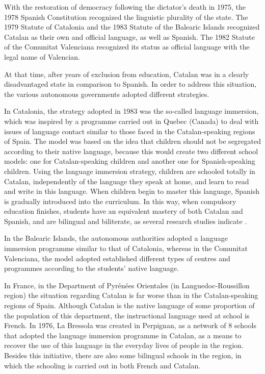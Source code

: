\begin{multicols}{2}
With the restoration of democracy following the dictator's death in 1975, the 1978 Spanish Constitution recognized the linguistic plurality of the state. The 1979 Statute of Catalonia and the 1983 Statute of the Balearic Islands recognized Catalan as their own and official language, as well as Spanish. The 1982 Statute of the Comunitat Valenciana recognized its status as official language with the legal name of Valencian.

At that time, after years of exclusion from education, Catalan was in a clearly disadvantaged state in comparison to Spanish. In order to address this situation, the various autonomous governments adopted different strategies.

In Catalonia, the strategy adopted in 1983 was the so-called language immersion, which was inspired by a programme carried out in Quebec (Canada) to deal with issues of language contact similar to those faced in the Catalan-speaking regions of Spain. The model was based on the idea that children should not be segregated according to their native language, because this would create two different school models: one for Catalan-speaking children and another one for Spanish-speaking children. Using the language immersion strategy, children are schooled totally in Catalan, independently of the language they speak at home, and learn to read and write in this language. When children begin to master this language, Spanish is gradually introduced into the curriculum. In this way, when compulsory education finishes, students have an equivalent mastery of both Catalan and Spanish, and are bilingual and biliterate, as several research studies indicate \cite{CAT-Nota5}.

In the Balearic Islands, the autonomous authorities adopted a language immersion programme similar to that of Catalonia, whereas in the Comunitat Valenciana, the model adopted established different types of centres and programmes according to the students' native language.

In France, in the Department of Pyrénées Orientales (in Languedoc-Roussillon region) the situation regarding Catalan is far worse than in the Catalan-speaking regions of Spain. Although Catalan is the native language of some proportion of the population of this department, the instructional language used at school is French. In 1976, La Bressola \cite{CAT-Nota6} was created in Perpignan, as a network of 8 schools that adopted the language immersion programme in Catalan, as a means to recover the use of this language in the everyday lives of people in the region. Besides this initiative, there are also some bilingual schools in the region, in which the schooling is carried out in both French and Catalan.


\end{multicols}
